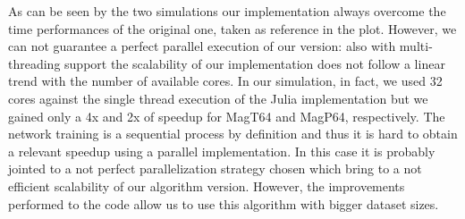 \documentclass{standalone}
\begin{document}
As can be seen by the two simulations our implementation always overcome the time performances of the original one, taken as reference in the plot.
However, we can not guarantee a perfect parallel execution of our version: also with multi-threading support the scalability of our implementation does not follow a linear trend with the number of available cores.
In our simulation, in fact, we used 32 cores against the single thread execution of the Julia implementation but we gained only a 4x and 2x of speedup for MagT64 and MagP64, respectively.
The network training is a sequential process by definition and thus it is hard to obtain a relevant speedup using a parallel implementation.
In this case it is probably jointed to a not perfect parallelization strategy chosen which bring to a not efficient scalability of our algorithm version.
However, the improvements performed to the code allow us to use this algorithm with bigger dataset sizes.
\end{document}
